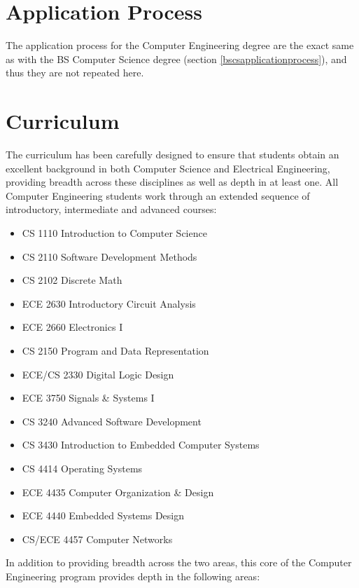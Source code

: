 \documentclass[10pt,letter]{book}
\newenvironment{itemlist}{
\begin{itemize}
\setlength{\itemsep}{0pt}
\setlength{\parskip}{0pt}}
{\end{itemize}}
\newcommand{\mysection}[1]{\section{#1}\renewcommand{\rightmark}{#1}}
\begin{document}
\mysection{Application Process}
\label{bscpeapplicationprocess}

The application process for the Computer Engineering degree are the
exact same as with the BS Computer Science degree (section
\ref{bscsapplicationprocess}), and thus they are not repeated here.


\mysection{Curriculum} %

The curriculum has been carefully designed to ensure that students
obtain an excellent background in both Computer Science and Electrical
Engineering, providing breadth across these disciplines as well as
depth in at least one. All Computer Engineering students work through
an extended sequence of introductory, intermediate and advanced
courses:

\begin{itemlist}
\item CS 1110 Introduction to Computer Science
\item CS 2110 Software Development Methods
\item CS 2102 Discrete Math
\item ECE 2630 Introductory Circuit Analysis
\item ECE 2660 Electronics I
\item CS 2150 Program and Data Representation
\item ECE/CS 2330 Digital Logic Design
\item ECE 3750 Signals \& Systems I
\item CS 3240 Advanced Software Development
\item CS 3430 Introduction to Embedded Computer Systems
\item CS 4414 Operating Systems
\item ECE 4435 Computer Organization \& Design
\item ECE 4440 Embedded Systems Design
\item CS/ECE 4457 Computer Networks
\end{itemlist}


In addition to providing breadth across the two areas,
this core of the Computer Engineering program provides
depth in the following areas:
\end{document}
